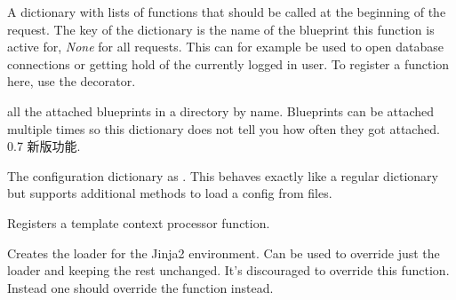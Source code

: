 \documentclass[a4paper,12pt]{sphinxmanual}
\begin{document}
\begin{fulllineitems}
\begin{fulllineitems}
\end{fulllineitems}


\begin{fulllineitems}
\label{api:flask.Flask.before_request_funcs}
A dictionary with lists of functions that should be called at the
beginning of the request.  The key of the dictionary is the name of
the blueprint this function is active for, \emph{None} for all requests.
This can for example be used to open database connections or
getting hold of the currently logged in user.  To register a
function here, use the {\hyperref[api:flask.Flask.before_request]{}} decorator.

\end{fulllineitems}


\begin{fulllineitems}
\label{api:flask.Flask.blueprints}
all the attached blueprints in a directory by name.  Blueprints
can be attached multiple times so this dictionary does not tell
you how often they got attached.
0.7 新版功能.
\end{fulllineitems}


\begin{fulllineitems}
\label{api:flask.Flask.config}
The configuration dictionary as {\hyperref[api:flask.Config]{}}.  This behaves
exactly like a regular dictionary but supports additional methods
to load a config from files.

\end{fulllineitems}


\begin{fulllineitems}
\label{api:flask.Flask.context_processor}
Registers a template context processor function.

\end{fulllineitems}


\begin{fulllineitems}
\label{api:flask.Flask.create_global_jinja_loader}
Creates the loader for the Jinja2 environment.  Can be used to
override just the loader and keeping the rest unchanged.  It's
discouraged to override this function.  Instead one should override
the {\hyperref[api:flask.Flask.jinja_loader]{}} function instead.


\end{fulllineitems}
\end{fulllineitems}
\end{document}
